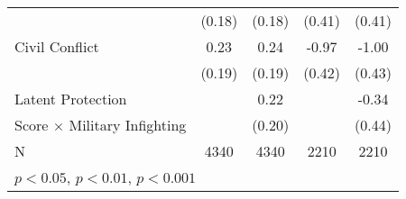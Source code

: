 \begin{table}[htbp]
\begin{tabular}{l*{4}{c}}
                    &      (0.18)         &      (0.18)         &      (0.41)         &      (0.41)         \\
Civil Conflict      &        0.23         &        0.24         &       -0.97\sym{*}  &       -1.00\sym{*}  \\
                    &      (0.19)         &      (0.19)         &      (0.42)         &      (0.43)         \\
Latent Protection   &                     &        0.22         &                     &       -0.34         \\
Score $\times$ Military Infighting&                     &      (0.20)         &                     &      (0.44)         \\
\hline
N                   &        4340         &        4340         &        2210         &        2210         \\
\hline\hline
\multicolumn{5}{l}{\footnotesize \sym{*} \(p<0.05\), \sym{**} \(p<0.01\), \sym{***} \(p<0.001\)}\\
\end{tabular}
\end{table}
